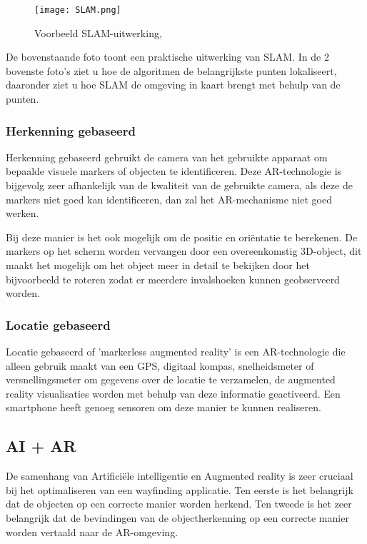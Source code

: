 \begin{figure}[H]
	\centering
	\texttt{[image: SLAM.png]}
	\caption{Voorbeeld SLAM-uitwerking, \autocite{AVRSpot2018}}
\end{figure}

De bovenstaande foto toont een praktische uitwerking van SLAM. In de 2 bovenste foto's ziet u hoe de algoritmen de belangrijkste punten lokaliseert, daaronder ziet u hoe SLAM de omgeving in kaart brengt met behulp van de punten.

\pagebreak
\subsubsection{Herkenning gebaseerd}
Herkenning gebaseerd gebruikt de camera van het gebruikte apparaat om bepaalde visuele markers of objecten te identificeren. Deze AR-technologie is bijgevolg zeer afhankelijk van de kwaliteit van de gebruikte camera, als deze de markers niet goed kan identificeren, dan zal het AR-mechanisme niet goed werken. \autocite{NewGenApps2017}

Bij deze manier is het ook mogelijk om de positie en oriëntatie te berekenen. De markers op het scherm worden vervangen door een overeenkomstig 3D-object, dit maakt het mogelijk om het object meer in detail te bekijken door het bijvoorbeeld te roteren zodat er meerdere invalshoeken kunnen geobserveerd worden.

\subsubsection{Locatie gebaseerd}
Locatie gebaseerd of 'markerless augmented reality' is een AR-technologie die alleen gebruik maakt van een GPS, digitaal kompas, snelheidsmeter of versnellingsmeter om gegevens over de locatie te verzamelen, de augmented reality visualisaties worden met behulp van deze informatie geactiveerd. Een smartphone heeft genoeg sensoren om deze manier te kunnen realiseren. \autocite{NewGenApps2017}

\subsection{AI + AR}
De samenhang van Artificiële intelligentie en Augmented reality is zeer cruciaal bij het optimaliseren van een wayfinding applicatie. Ten eerste is het belangrijk dat de objecten op een correcte manier worden herkend. Ten tweede is het zeer belangrijk dat de bevindingen van de objectherkenning op een correcte manier worden vertaald naar de AR-omgeving. 
\newpage
